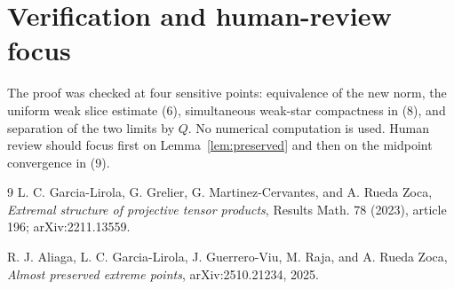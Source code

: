 \documentclass[11pt]{article}
\begin{document}
\section{Verification and human-review focus}

The proof was checked at four sensitive points: equivalence of the new norm,
the uniform weak slice estimate (6), simultaneous weak-star compactness in
(8), and separation of the two limits by $Q$.  No numerical computation is
used.  Human review should focus first on Lemma~\ref{lem:preserved} and then on
the midpoint convergence in (9).

\begin{thebibliography}{9}
L. C. Garcia-Lirola, G. Grelier, G. Martinez-Cervantes, and A. Rueda Zoca,
\emph{Extremal structure of projective tensor products},
Results Math. 78 (2023), article 196; arXiv:2211.13559.

R. J. Aliaga, L. C. Garcia-Lirola, J. Guerrero-Viu, M. Raja, and
A. Rueda Zoca,
\emph{Almost preserved extreme points}, arXiv:2510.21234, 2025.
\end{thebibliography}
\end{document}
